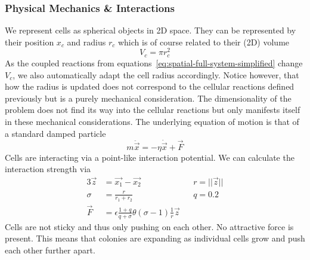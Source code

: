\documentclass[10pt,A4paper]{article}
\numberwithin{equation}{section}
\begin{document}
\subsubsection{Physical Mechanics \& Interactions}
We represent cells as spherical objects in 2D space.
They can be represented by their position $x_c$ and radius $r_c$ which is of course related to their (2D) volume
\begin{equation}
    V_c = \pi r_c^2
\end{equation}
As the coupled reactions from equations~\eqref{eq:spatial-full-system-simplified} change $V_c$, we also automatically adapt the cell radius accordingly.
Notice however, that how the radius is updated does not correspond to the cellular reactions defined previously but is a purely mechanical consideration.
The dimensionality of the problem does not find its way into the cellular reactions but only manifests itself in these mechanical considerations.
The underlying equation of motion is that of a standard damped particle
\begin{equation}
    m \ddot{\vec{x}} = -\eta\dot{\vec{x}} + \vec{F}
\end{equation}
Cells are interacting via a point-like interaction potential.
We can calculate the interaction strength via
\begin{alignat}{3}
    \vec{z} &= \vec{x_1} - \vec{x_2} \hspace{2em}&& r = ||\vec{z}||\\
    \sigma &= \frac{r}{r_1+r_2} && q=0.2\\
    \vec{F} &= \epsilon \frac{1+q}{q+\sigma} \theta(\sigma - 1) \frac{1}{r}\vec{z}
\end{alignat}
Cells are not sticky and thus only pushing on each other.
No attractive force is present.
This means that colonies are expanding as individual cells grow and push each other further apart.
%
%
%
\end{document}
